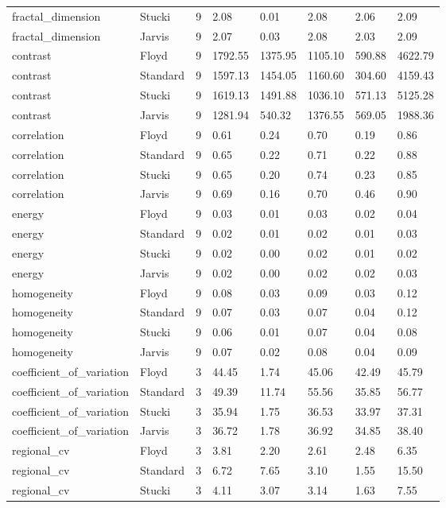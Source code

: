 \begin{tabular}{llrlllll}
fractal_dimension & Stucki & 9 & 2.08 & 0.01 & 2.08 & 2.06 & 2.09 \\
fractal_dimension & Jarvis & 9 & 2.07 & 0.03 & 2.08 & 2.03 & 2.09 \\
contrast & Floyd & 9 & 1792.55 & 1375.95 & 1105.10 & 590.88 & 4622.79 \\
contrast & Standard & 9 & 1597.13 & 1454.05 & 1160.60 & 304.60 & 4159.43 \\
contrast & Stucki & 9 & 1619.13 & 1491.88 & 1036.10 & 571.13 & 5125.28 \\
contrast & Jarvis & 9 & 1281.94 & 540.32 & 1376.55 & 569.05 & 1988.36 \\
correlation & Floyd & 9 & 0.61 & 0.24 & 0.70 & 0.19 & 0.86 \\
correlation & Standard & 9 & 0.65 & 0.22 & 0.71 & 0.22 & 0.88 \\
correlation & Stucki & 9 & 0.65 & 0.20 & 0.74 & 0.23 & 0.85 \\
correlation & Jarvis & 9 & 0.69 & 0.16 & 0.70 & 0.46 & 0.90 \\
energy & Floyd & 9 & 0.03 & 0.01 & 0.03 & 0.02 & 0.04 \\
energy & Standard & 9 & 0.02 & 0.01 & 0.02 & 0.01 & 0.03 \\
energy & Stucki & 9 & 0.02 & 0.00 & 0.02 & 0.01 & 0.02 \\
energy & Jarvis & 9 & 0.02 & 0.00 & 0.02 & 0.02 & 0.03 \\
homogeneity & Floyd & 9 & 0.08 & 0.03 & 0.09 & 0.03 & 0.12 \\
homogeneity & Standard & 9 & 0.07 & 0.03 & 0.07 & 0.04 & 0.12 \\
homogeneity & Stucki & 9 & 0.06 & 0.01 & 0.07 & 0.04 & 0.08 \\
homogeneity & Jarvis & 9 & 0.07 & 0.02 & 0.08 & 0.04 & 0.09 \\
coefficient_of_variation & Floyd & 3 & 44.45 & 1.74 & 45.06 & 42.49 & 45.79 \\
coefficient_of_variation & Standard & 3 & 49.39 & 11.74 & 55.56 & 35.85 & 56.77 \\
coefficient_of_variation & Stucki & 3 & 35.94 & 1.75 & 36.53 & 33.97 & 37.31 \\
coefficient_of_variation & Jarvis & 3 & 36.72 & 1.78 & 36.92 & 34.85 & 38.40 \\
regional_cv & Floyd & 3 & 3.81 & 2.20 & 2.61 & 2.48 & 6.35 \\
regional_cv & Standard & 3 & 6.72 & 7.65 & 3.10 & 1.55 & 15.50 \\
regional_cv & Stucki & 3 & 4.11 & 3.07 & 3.14 & 1.63 & 7.55 \\

\end{tabular}

